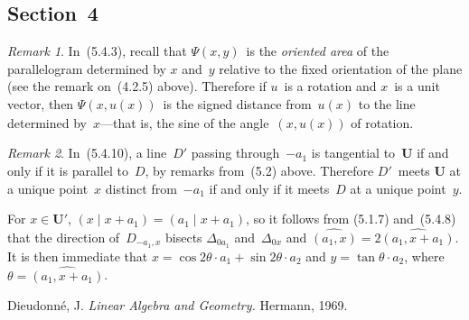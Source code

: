 \documentclass[letterpaper,12pt]{article}
\newcommand{\U}{\mathbf{U}}
\newcommand{\mult}{\cdot}
\newcommand{\innerprod}[2]{({#1}\;|\;{#2})}
\newcommand{\ang}[2]{\widehat{(#1,#2)}}
\theoremstyle{definition}
\theoremstyle{remark}
\newtheorem*{rmk}{Remark}
\begin{document}
\subsection*{Section~4}
\begin{rmk}
In~(5.4.3), recall that \(\Psi(x,y)\)~is the \emph{oriented area} of the parallelogram determined by \(x\) and~\(y\) relative to the fixed orientation of the plane (see the remark on~(4.2.5) above). Therefore if \(u\)~is a rotation and \(x\)~is a unit vector, then \(\Psi(x,u(x))\)~is the signed distance from~\(u(x)\) to the line determined by~\(x\)---that is, the sine of the angle~\(\ang{x}{u(x)}\) of rotation.
\end{rmk}

\begin{rmk}
In~(5.4.10), a line~\(D'\) passing through~\(-a_1\) is tangential to~\(\U\) if and only if it is parallel to~\(D\), by remarks from~(5.2) above. Therefore \(D'\)~meets \(\U\) at a unique point~\(x\) distinct from~\(-a_1\) if and only if it meets~\(D\) at a unique point~\(y\).

For \(x\in\U'\), \(\innerprod{x}{x+a_1}=\innerprod{a_1}{x+a_1}\), so it follows from (5.1.7) and~(5.4.8) that the direction of~\(D_{-a_1,x}\) bisects \(\Delta_{0a_1}\) and~\(\Delta_{0x}\) and \(\ang{a_1}{x}=2\ang{a_1}{x+a_1}\). It is then immediate that \(x=\cos 2\theta\mult a_1+\sin 2\theta\mult a_2\) and \(y=\tan\theta\mult a_2\), where \(\theta=\ang{a_1}{x+a_1}\).
\end{rmk}

\begin{thebibliography}{0}
 Dieudonn\'e, J. \textit{Linear Algebra and Geometry.} Hermann, 1969.
\end{thebibliography}
\end{document}
